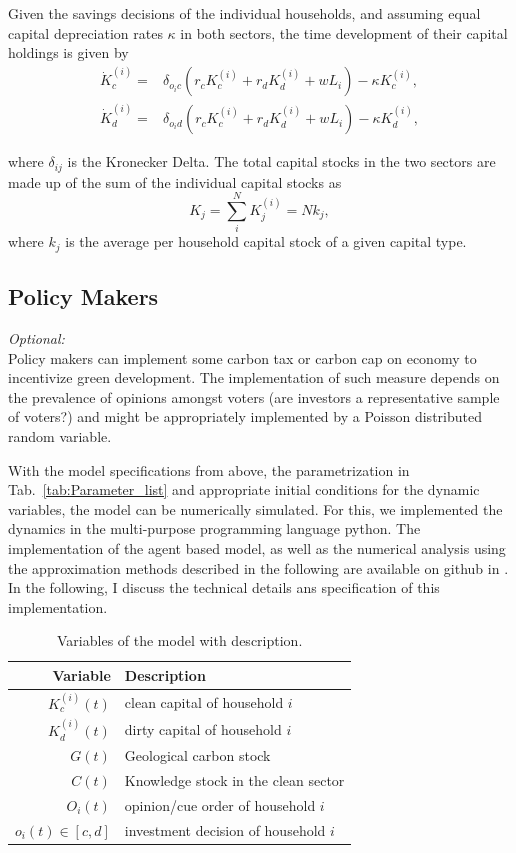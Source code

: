Given the savings decisions of the individual households, and assuming equal capital depreciation rates $\kappa$ in both sectors, the time development of their capital holdings is given by
\begin{align}
  \dot{K}_c^{(i)} =& \delta_{o_ic} \left( r_c K_c^{(i)} + r_d K_d^{(i)} + w L_i \right) - \kappa K_c^{(i)}, \label{eq:clean_investment}\\
  \dot{K}_d^{(i)} =& \delta_{o_id} \left( r_c K_c^{(i)} + r_d K_d^{(i)} + w L_i \right) - \kappa K_d^{(i)}, \label{eq:dirty_investment}
\end{align}

where $\delta_{ij}$ is the Kronecker Delta. The total capital stocks in the two sectors are made up of the sum of the individual capital stocks as
\begin{equation}
K_j = \sum_i^N K_j^{(i)} = N k_j,
\end{equation}
where $k_j$ is the average per household capital stock of a given capital type.

\subsection{Policy Makers}
\textit{Optional:} \\
Policy makers can implement some carbon tax or carbon cap on economy to incentivize green development. The implementation of such measure depends on the prevalence of opinions amongst voters (are investors a representative sample of voters?) and might be appropriately implemented by a Poisson distributed random variable.

With the model specifications from above, the parametrization in Tab.~\ref{tab:Parameter_list} and appropriate initial conditions for the dynamic variables, the model can be numerically simulated.
For this, we implemented the dynamics in the multi-purpose programming language python. The implementation of the agent based model, as well as the numerical analysis using the approximation methods described in the following are available on github in \cite{kolb2018}.
In the following, I discuss the technical details ans specification of this implementation.


\begin{table}[t]
	\centering
	\begin{tabular}{r|l}
		Variable & Description \\\hline
		$K^{(i)}_c(t)$ & clean capital of household $i$ \\
		$K^{(i)}_d(t)$ & dirty capital of household $i$ \\
		$G(t)$ & Geological carbon stock \\
                $C(t)$ & Knowledge stock in the clean sector \\
		$O_i(t)$ & opinion/cue order of household $i$ \\
		$o_i(t) \in [c,d]$ & investment decision of household $i$ 
	\end{tabular}
	\caption{Variables of the model with description.}
	\label{tab:independent_variables}
\end{table}

